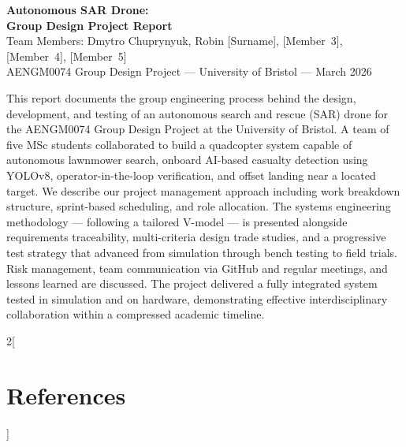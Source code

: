 \documentclass[10pt,a4paper]{article}
\begin{document}
\begin{center}
  {\LARGE\bfseries Autonomous SAR Drone:\\[3pt]
   Group Design Project Report}\\[10pt]
  {\large Team Members: Dmytro Chuprynyuk, Robin [Surname], [Member~3], [Member~4], [Member~5]}\\[4pt]
  {\normalsize AENGM0074 Group Design Project --- University of Bristol --- March 2026}
\end{center}

\vspace{4pt}

\begin{abstractbox}
This report documents the group engineering process behind the design, development, and testing of an autonomous search and rescue (SAR) drone for the AENGM0074 Group Design Project at the University of Bristol. A team of five MSc students collaborated to build a quadcopter system capable of autonomous lawnmower search, onboard AI-based casualty detection using YOLOv8, operator-in-the-loop verification, and offset landing near a located target. We describe our project management approach including work breakdown structure, sprint-based scheduling, and role allocation. The systems engineering methodology --- following a tailored V-model --- is presented alongside requirements traceability, multi-criteria design trade studies, and a progressive test strategy that advanced from simulation through bench testing to field trials. Risk management, team communication via GitHub and regular meetings, and lessons learned are discussed. The project delivered a fully integrated system tested in simulation and on hardware, demonstrating effective interdisciplinary collaboration within a compressed academic timeline.
\end{abstractbox}

\vspace{6pt}










\newpage
\begin{multicols}{2}[\section*{References}]
\printbibliography[heading=none]
\end{multicols}
\end{document}

